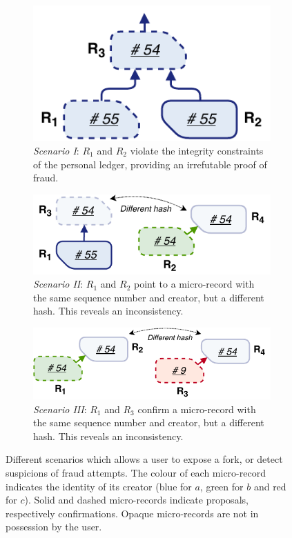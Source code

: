 \begin{figure}[t!]
	\centering
	\begin{subfigure}[t]{.33\textwidth}
		\centering
		\captionsetup{width=.9\linewidth}
		\includegraphics[width=.65\linewidth]{trustchain/assets/fraud_scenario_1}
		\caption{\emph{Scenario I}: $ R_1 $ and $ R_2 $ violate the integrity constraints of the personal ledger, providing an irrefutable proof of fraud.}
		\label{fig:fraud_scenario_1}
	\end{subfigure}%
	\begin{subfigure}[t]{.33\textwidth}
		\centering
		\captionsetup{width=.89\linewidth}
		\includegraphics[width=.9\linewidth]{trustchain/assets/fraud_scenario_2}
		\caption{\emph{Scenario II}: $ R_1 $ and $ R_2 $ point to a micro-record with the same sequence number and creator, but a different hash. This reveals an inconsistency.}
		\label{fig:fraud_scenario_2}
	\end{subfigure}%
	\begin{subfigure}[t]{.33\textwidth}
		\centering
		\captionsetup{width=.93\linewidth}
		\includegraphics[width=.98\linewidth]{trustchain/assets/fraud_scenario_3}
		\caption{\emph{Scenario III}: $ R_1 $ and $ R_3 $ confirm a micro-record with the same sequence number and creator, but a different hash. This reveals an inconsistency.}
		\label{fig:fraud_scenario_3}
	\end{subfigure}
	\caption{Different scenarios which allows a user to expose a fork, or detect suspicions of fraud attempts. The colour of each micro-record indicates the identity of its creator (blue for $ a $, green for $ b $ and red for $ c $). Solid and dashed micro-records indicate proposals, respectively confirmations. Opaque micro-records are not in possession by the user.}
	\label{fig:fraud_scenarios}
\end{figure}

